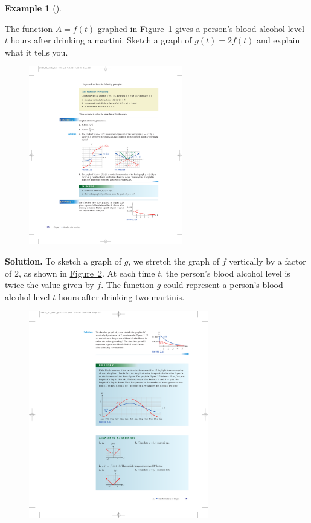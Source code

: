 \documentclass[10pt,]{book}
\theoremstyle{plain}
\theoremstyle{definition}
\theoremstyle{definition}
\theoremstyle{definition}
\newtheorem{example}[theorem]{Example}
\theoremstyle{definition}
\theoremstyle{definition}
\numberwithin{equation}{section}
\begin{document}
\begin{example}[]\label{example-alcohol-level}

        The function \(A = f (t)\) graphed in \hyperref[fig-surge-alcohol]{Figure~\ref{fig-surge-alcohol}} gives a person's blood alcohol level \(t\) hours after drinking a martini. Sketch a graph of \(g(t) = 2 f (t)\) and explain what it tells you.
\leavevmode%
\begin{figure}
\centering
\includegraphics[width=0.60\textwidth,]{images/fig-surge-alcohol.pdf}\caption{\label{fig-surge-alcohol}}
\end{figure}
\par\medskip\noindent%
\textbf{Solution.}\quad 
            To sketch a graph of \(g\), we stretch the graph of \(f\) vertically by a factor of \(2\), as shown in \hyperref[fig-surge-alcohol2]{Figure~\ref{fig-surge-alcohol2}}. At each time \(t\), the person’s blood alcohol level is twice the value given by \(f\). The function \(g\) could represent a person's blood alcohol level \(t\) hours after drinking two martinis.
\leavevmode%
\begin{figure}
\centering
\includegraphics[width=0.70\textwidth,]{images/fig-surge-alcohol2.pdf}\caption{\label{fig-surge-alcohol2}}
\end{figure}
\end{example}
\end{document}
